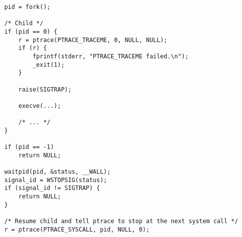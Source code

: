\documentclass[a4paper, 10pt]{report}
\begin{document}
\begin{lstlisting}
    pid = fork();

    /* Child */
    if (pid == 0) {
        r = ptrace(PTRACE_TRACEME, 0, NULL, NULL);
        if (r) {
            fprintf(stderr, "PTRACE_TRACEME failed.\n");
            _exit(1);
        }

        raise(SIGTRAP);

        execve(...);

        /* ... */
    }

    if (pid == -1)
        return NULL;

    waitpid(pid, &status, __WALL);
    signal_id = WSTOPSIG(status);
    if (signal_id != SIGTRAP) {
        return NULL;
    }

    /* Resume child and tell ptrace to stop at the next system call */
    r = ptrace(PTRACE_SYSCALL, pid, NULL, 0);
\end{lstlisting}
\end{document}
